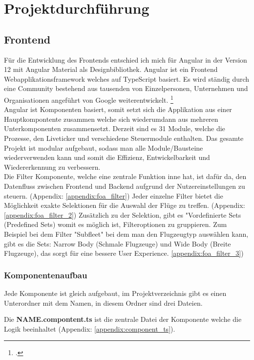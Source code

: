 \section{Projektdurchführung}

	\subsection{Frontend}
	Für die Entwicklung des Frontends entschied ich mich für Angular in der Version 12 mit Angular Material als Designbibliothek. Angular ist ein Frontend Webapplikationsframework welches auf TypeScript basiert. Es wird ständig durch eine Community bestehend aus tausenden von Einzelpersonen, Unternehmen und Organisationen angeführt von Google weiterentwickelt. \footcite{3}\\
	Angular ist Komponenten basiert, somit setzt sich die Applikation aus einer Hauptkompontente zusammen welche sich wiederumdann aus mehreren Unterkomponenten zusammensetzt. Derzeit sind es 31 Module, welche die Prozesse, den Liveticker und verschiedene Steuermodule enthalten. Das gesamte Projekt ist modular aufgebaut, sodass man alle Module/Bausteine wiederverwenden kann und somit die Effizienz, Entwickelbarkeit und Wiedererkennung zu verbessern.\\
	Die Filter Komponente, welche eine zentrale Funktion inne hat, ist dafür da, den Datenfluss zwischen Frontend und Backend aufgrund der Nutzereinstellungen zu steuern. (Appendix: \ref{appendix:foa_filter}) Jeder einzelne Filter bietet die Möglichkeit exakte Selektionen für die Auswahl der Flüge zu treffen. (Appendix: \ref{appendix:foa_filter_2}) Zusätzlich zu der Selektion, gibt es "Vordefinierte Sets (Predefined Sets) womit es möglich ist, Filteroptionen zu gruppieren. Zum Beispiel bei dem Filter "Subfleet" bei dem man den Flugzeugtyp auswählen kann, gibt es die Sets: Narrow Body (Schmale Flugzeuge) und Wide Body (Breite Flugzeuge), das sorgt für eine bessere User Experience. \ref{appendix:foa_filter_3})

	\subsubsection{Komponentenaufbau}
	{
		\noindent
		Jede Komponente ist gleich aufgebaut, im Projektverzeichnis gibt es einen Unterordner mit dem Namen, in diesem Ordner sind drei Dateien.
	}
	\vspace{10pt}

	{
		\noindent
		Die \textbf{NAME.compontent.ts} ist die zentrale Datei der Komponente welche die Logik beeinhaltet (Appendix: \ref{appendix:component_ts}).
	}
	\vspace{10pt}

